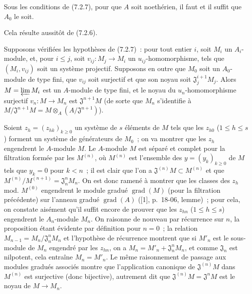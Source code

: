 \begin{corollary}[7.2.8]
\label{0.7.2.8-fr}
Sous les conditions de \textup{(7.2.7)}, pour que $A$ soit noethérien, il faut et il
suffit que $A_0$ le soit.
\end{corollary}

Cela résulte aussitôt de (7.2.6).

\begin{proposition}[7.2.9]
\label{0.7.2.9-fr}
Supposons vérifiées les hypothèses de \textup{(7.2.7)}~: pour tout entier $i$, soit
$M_i$ un $A_i$-module, et, pour $i\leq j$, soit
$v_{ij}:M_j\to M_i$ un $u_{ij}$-homomorphisme, tels que $(M_i,v_{ij})$ soit un
système projectif. Supposons en outre que $M_0$ soit un $A_0$-module de type
fini, que $v_{ij}$ soit surjectif et que son noyau soit
$\mathfrak J_j^{i+1}M_j$. Alors $M=\varprojlim M_i$ est un $A$-module de type
fini, et le noyau du $u_n$-homomorphisme surjectif $v_n:M\to M_n$ est
$\mathfrak J^{n+1}M$ \textup{(de sorte que $M_n$ s'identifie à
$M/\mathfrak J^{n+1}M=M\otimes_A(A/\mathfrak J^{n+1})$)}.
\end{proposition}

Soient $z_h=(z_{hk})_{k\geq0}$ un système de $s$ éléments de $M$ tels que les
$z_{h0}$ ($1\leq h\leq s$) forment un système de générateurs de $M_0$~; on va
montrer que les $z_h$ engendrent le $A$-module $M$. Le $A$-module $M$ est
séparé et complet pour la filtration formée par les $M^{(n)}$, où $M^{(n)}$
est l'ensemble des $y=(y_k)_{k\geq0}$ de $M$ tels que $y_k=0$ pour $k<n$~;
il est clair que l'on a $\mathfrak J^{(n)}M\subset M^{(n)}$ et que
$M^{(n)}/M^{(n+1)}=\mathfrak J_n^nM_n$. On est donc ramené à montrer que les
classes des $z_h$ mod. $M^{(0)}$ engendrent le module gradué
$\operatorname{grad}(M)$ (pour la filtration précédente) sur l'anneau gradué
$\operatorname{grad}(A)$ ([1], p.~18-06, lemme)~; pour cela, on constate
aisément qu'il suffit encore de prouver que les $z_{hn}$ ($1\leq h\leq s$)
engendrent le $A_n$-module $M_n$. On raisonne de nouveau par récurrence sur
$n$, la proposition étant évidente par définition pour $n=0$~; la relation
$M_{n-1}=M_n/\mathfrak J_n^nM_n$ et l'hypothèse de récurrence montrent que si
$M'_n$ est le sous-module de $M_n$ engendré par les $z_{hn}$, on a
$M_n=M'_n+\mathfrak J_n^nM_n$, et comme $\mathfrak J_n$ est nilpotent, cela
entraîne $M_n=M'_n$. Le même raisonnement de passage aux modules gradués
associés montre que l'application canonique de $\mathfrak J^{(n)}M$ dans
$M^{(n)}$ est surjective (donc bijective), autrement dit que
$\mathfrak J^{(n)}M=\mathfrak J^nM$ est le noyau de $M\to M_n$.

